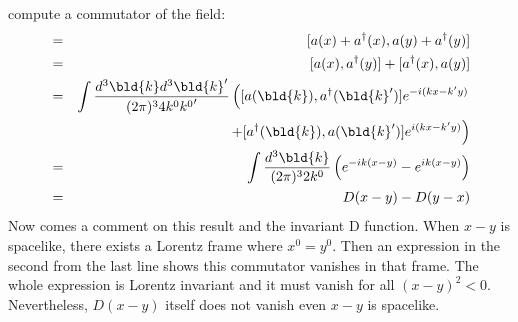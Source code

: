 compute a commutator of the field:
\begin{eqnarray}
[\varphi(x), \varphi(y)]
&=&
[a(x) + a^\dagger(x),  a(y) + a^\dagger(y) ]
\nonumber\\
&=&
[a(x),  a^\dagger(y) ] + [a^\dagger(x),  a(y) ]
\nonumber\\
&=&
\int \frac{d^3 \bld{k} d^3 \bld{k}'}{(2\pi)^3 4 k^0 {k^0}'} 
\left(
[a(\bld{k}), a^\dagger(\bld{k}')]e^{-i(kx - k'y)}
\right.
\nonumber\\
&&
\left.
\hspace{35mm}
+
[a^\dagger(\bld{k}), a(\bld{k}')]e^{i(kx - k'y)}
\right)
\nonumber\\
&=&
\int \frac{d^3 \bld{k} }{(2\pi)^3 2 k^0} 
\left(
e^{-ik(x - y)} - e^{ik(x - y)}
\right)
\nonumber\\
&=&
D(x-y) - D(y-x)
\label{eqn:scfieldcommrel}
\end{eqnarray}
Now comes a comment on this result and the invariant D function.
When $x-y$ is spacelike, there exists a Lorentz frame where $x^0 = y^0$.
Then an expression in the second from the last line shows 
this commutator vanishes in that frame.
The whole expression is Lorentz invariant and it must vanish for all $(x-y)^2 < 0$.
Nevertheless, $D(x-y)$ itself does not vanish even $x-y$ is spacelike.


